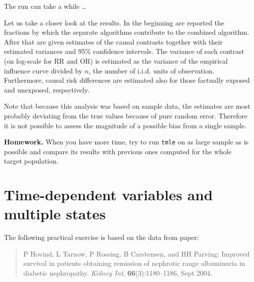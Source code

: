 \documentclass[
]{book}
\newenvironment{Shaded}{\begin{snugshade}}{\end{snugshade}}
\newcommand{\AttributeTok}[1]{\textcolor[rgb]{0.13,0.29,0.53}{#1}}
\newcommand{\FunctionTok}[1]{\textcolor[rgb]{0.13,0.29,0.53}{\textbf{#1}}}
\newcommand{\NormalTok}[1]{#1}
\newcommand{\OtherTok}[1]{\textcolor[rgb]{0.56,0.35,0.01}{#1}}
\newcommand{\SpecialCharTok}[1]{\textcolor[rgb]{0.81,0.36,0.00}{\textbf{#1}}}
\newcommand{\StringTok}[1]{\textcolor[rgb]{0.31,0.60,0.02}{#1}}
\begin{document}
The run can take a while \ldots{}

\begin{Shaded}
\end{Shaded}

Let us take a closer look at the results. In the beginning are reported
the fractions by which the separate algorithms contribute to the
combined algorithm. After that are given estimates of the causal
contrasts together with their estimated variances and 95\% confidence
intervals. The variance of each contrast (on log-scale for RR and OR) is
estimated as the variance of the empirical influence curve divided by
\(n\), the number of i.i.d. units of observation. Furthermore, causal risk
differences are estimated also for those factually exposed and
unexposed, respectively.

Note that because this analysis was based on sample data, the estimates
are most probably deviating from the true values because of pure random
error. Therefore it is not possible to assess the magnitude of a
possible bias from a single sample.

\textbf{Homework.} When you have more time, try to run \texttt{tmle} on as large
sample as is possible and compare its results with previous ones
computed for the whole target population.

\chapter{Time-dependent variables and multiple states}\label{time-dependent-variables-and-multiple-states}

The following practical exercise is based on the data from paper:

\begin{quote}
P Hovind, L Tarnow, P Rossing, B Carstensen, and HH Parving:
Improved survival in patients obtaining remission of nephrotic range
albuminuria in diabetic nephropathy.
\emph{Kidney Int}, \textbf{66}(3):1180--1186, Sept 2004.
\end{quote}
\end{document}
